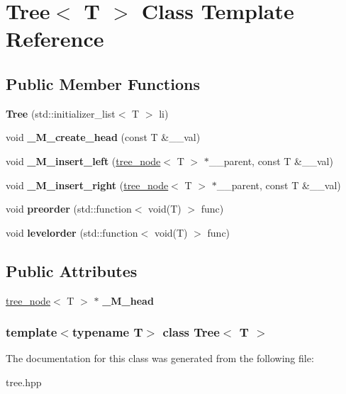\hypertarget{classTree}{\section{\-Tree$<$ \-T $>$ \-Class \-Template \-Reference}
\label{classTree}
}
\subsection*{\-Public \-Member \-Functions}
\begin{DoxyCompactItemize}
\item 
\hypertarget{classTree_abf0ada0c7bf5c29c77b0dfa272b1c962}{{\bfseries \-Tree} (std\-::initializer\-\_\-list$<$ \-T $>$ li)}\label{classTree_abf0ada0c7bf5c29c77b0dfa272b1c962}

\item 
\hypertarget{classTree_a432e8db9188b7f49eb838e56267e28c0}{void {\bfseries \-\_\-\-M\-\_\-create\-\_\-head} (const \-T \&\-\_\-\-\_\-val)}\label{classTree_a432e8db9188b7f49eb838e56267e28c0}

\item 
\hypertarget{classTree_ae8cebb0ea4c08cfbed02d2dd65171bb3}{void {\bfseries \-\_\-\-M\-\_\-insert\-\_\-left} (\hyperlink{structtree__node}{tree\-\_\-node}$<$ \-T $>$ $\ast$\-\_\-\-\_\-parent, const \-T \&\-\_\-\-\_\-val)}\label{classTree_ae8cebb0ea4c08cfbed02d2dd65171bb3}

\item 
\hypertarget{classTree_a3355e5ff7d73ea87723018f34d83de4e}{void {\bfseries \-\_\-\-M\-\_\-insert\-\_\-right} (\hyperlink{structtree__node}{tree\-\_\-node}$<$ \-T $>$ $\ast$\-\_\-\-\_\-parent, const \-T \&\-\_\-\-\_\-val)}\label{classTree_a3355e5ff7d73ea87723018f34d83de4e}

\item 
\hypertarget{classTree_a4fc667c61e23b6d537e257e82e65bb2c}{void {\bfseries preorder} (std\-::function$<$ void(\-T) $>$ func)}\label{classTree_a4fc667c61e23b6d537e257e82e65bb2c}

\item 
\hypertarget{classTree_a1b635b63f42dedabaeda30d2afe89724}{void {\bfseries levelorder} (std\-::function$<$ void(\-T) $>$ func)}\label{classTree_a1b635b63f42dedabaeda30d2afe89724}

\end{DoxyCompactItemize}
\subsection*{\-Public \-Attributes}
\begin{DoxyCompactItemize}
\item 
\hypertarget{classTree_a00e7082a4f3d89a6c23e7c9ad8eddc02}{\hyperlink{structtree__node}{tree\-\_\-node}$<$ \-T $>$ $\ast$ {\bfseries \-\_\-\-M\-\_\-head}}\label{classTree_a00e7082a4f3d89a6c23e7c9ad8eddc02}

\end{DoxyCompactItemize}
\subsubsection*{template$<$typename T$>$ class Tree$<$ T $>$}



\-The documentation for this class was generated from the following file\-:\begin{DoxyCompactItemize}
\item 
tree.\-hpp\end{DoxyCompactItemize}
